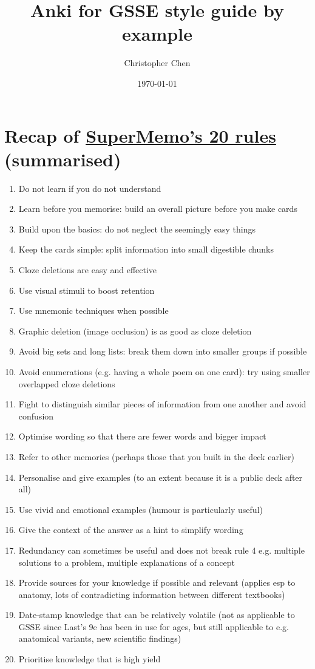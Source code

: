 \documentclass[11pt]{article}
\author{Christopher Chen}
\date{\today}
\title{Anki for GSSE style guide by example}
\begin{document}
\maketitle
\tableofcontents


\section{Recap of \href{https://www.supermemo.com/articles/20rules.htm}{SuperMemo's 20 rules} (summarised)}
\label{sec:org408fb5e}
\begin{enumerate}
\item Do not learn if you do not understand
\item Learn before you memorise: build an overall picture before you make cards
\item Build upon the basics: do not neglect the seemingly easy things
\item Keep the cards simple: split information into small digestible chunks
\item Cloze deletions are easy and effective
\item Use visual stimuli to boost retention
\item Use mnemonic techniques when possible
\item Graphic deletion (image occlusion) is as good as cloze deletion
\item Avoid big sets and long lists: break them down into smaller groups if possible
\item Avoid enumerations (e.g. having a whole poem on one card): try using smaller overlapped cloze deletions
\item Fight to distinguish similar pieces of information from one another and avoid confusion
\item Optimise wording so that there are fewer words and bigger impact
\item Refer to other memories (perhaps those that you built in the deck earlier)
\item Personalise and give examples (to an extent because it is a public deck after all)
\item Use vivid and emotional examples (humour is particularly useful)
\item Give the context of the answer as a hint to simplify wording
\item Redundancy can sometimes be useful and does not break rule 4 e.g. multiple solutions to a problem, multiple explanations of a concept
\item Provide sources for your knowledge if possible and relevant (applies esp to anatomy, lots of contradicting information between different textbooks)
\item Date-stamp knowledge that can be relatively volatile (not as applicable to GSSE since Last's 9e has been in use for ages, but still applicable to e.g. anatomical variants, new scientific findings)
\item Prioritise knowledge that is high yield
\end{enumerate}
\end{document}
